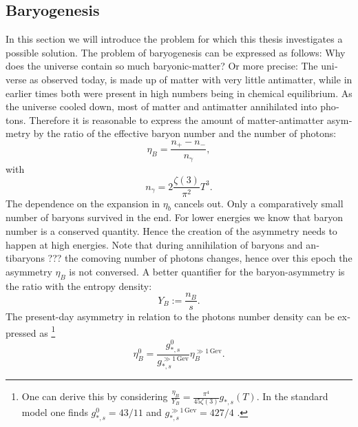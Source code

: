 \documentclass[master,       %
               twoside,        %
               BCOR10mm,       %
               english,ngerman, %
               ]{GAUBM}
\begin{document}
\begin{otherlanguage}{english}
\section{Baryogenesis}
In this section we will introduce the problem for which this thesis investigates a possible solution.
The problem of baryogenesis can be expressed as follows: Why does the universe contain so much baryonic-matter? Or more precise: The universe as observed today, is made up of matter with very little antimatter, while in earlier times both were present in high numbers being in chemical equilibrium. As the universe cooled down, most of matter and antimatter annihilated into photons. Therefore it is reasonable to express the amount of matter-antimatter asymmetry by the ratio of the effective baryon number and the number of photons:
\begin{equation}
	\eta_B = \frac{n_+ - n_-}{n_\gamma},
\end{equation}
with
\begin{equation}
	n_\gamma = 2 \frac{\zeta(3)}{\pi^2} T^3.
\end{equation}
The dependence on the expansion in $\eta_b$ cancels out.
Only a comparatively small number of baryons survived in the end.
For lower energies we know that baryon number is a conserved quantity. Hence the creation of the asymmetry needs to happen at high energies.
Note that during annihilation of baryons and antibaryons ??? the comoving number of photons changes, hence over this epoch the asymmetry $\eta_B$ is not conversed. A better quantifier for the baryon-asymmetry
is the ratio with the entropy density:
\begin{equation}
	\label{eq:baryon_abundance}
	Y_B := \frac{n_B}{s}.
\end{equation}
The present-day asymmetry in relation to the photons number density can be expressed as \footnote{
One can derive this by considering $\frac{\eta_B}{Y_B} = \frac{\pi^4}{45 \zeta(3)} g_{*, s}(T)$.
In the standard model one finds $g_{*,s}^0 = 43/11$ and $g_{*, s}^{\gg 1 \, \mathrm{Gev}} = 427/4$ \cite[sec. 3.4]{the_early_universe_kolb_and_turner}.
}
\begin{equation}
	\eta_B^0 = \frac{g_{*,s}^0}{g_{*, s}^{\gg 1 \, \mathrm{Gev}}} \eta_B^{\gg 1 \, \mathrm{Gev}}.
\end{equation}


\end{otherlanguage}
\end{document}

